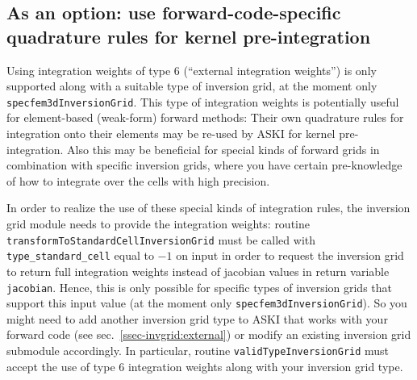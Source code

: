 \documentclass[12pt,a4paper]{article}
\newcommand{\lcode}[1]{\nolinkurl{#1}}
\newcommand{\ASKI}{ {\ttfamily ASKI} }
\begin{document}
\subsection{As an option: use forward-code-specific quadrature rules for kernel pre-integration} \label{ssec-extend:external_intw}
Using integration weights of type 6 (``external integration weights'') is only supported along with a suitable 
type of inversion grid, at the moment only \lcode{specfem3dInversionGrid}. This type of integration weights
is potentially useful for element-based (weak-form) forward methods: Their own quadrature rules for integration onto 
their elements may be re-used by \ASKI{} for kernel pre-integration. Also this may be beneficial for special kinds of 
forward grids in combination with specific inversion grids, where you have certain pre-knowledge of how to 
integrate over the cells with high precision. 

In order to realize the use of these special kinds of integration rules, the inversion grid module needs to provide the
integration weights: routine \lcode{transformToStandardCellInversionGrid} must be called with 
\lcode{type_standard_cell} equal to $-1$ on input in order to request the inversion grid to return full 
integration weights instead of jacobian values in return variable \lcode{jacobian}.
Hence, this is only possible for specific types of inversion grids that support this input value (at the moment 
only \lcode{specfem3dInversionGrid}). So you might need to add another inversion grid type to \ASKI{} that works 
with your forward code (see sec.~\ref{ssec-invgrid:external}{}) or modify an existing inversion grid submodule 
accordingly. In particular, routine \lcode{validTypeInversionGrid} must accept the use of type 6 integration 
weights along with your inversion grid type.

\end{document}

